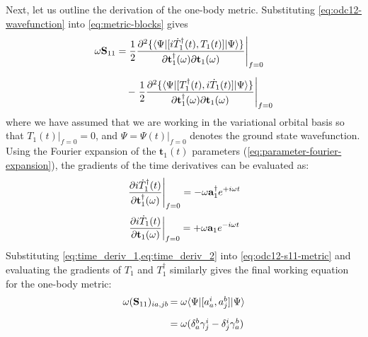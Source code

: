 Next, let us outline the derivation of the one-body metric.
Substituting \cref{eq:odc12-wavefunction} into \cref{eq:metric-blocks} gives
\begin{equation}
    \label{eq:odc12-s11-metric}
    \begin{array}{r@{\,}l}
        \omega
        \mathbf{S}_{11}
        =
        &
        \left.
            \dfrac{1}{2}
            \dfrac{%
                \partial^2
                \{\langle\Psi|
                    [i\dot{T}_1^\dagger(t), T_1(t)]
                |\Psi\rangle\}
            }{%
                \partial \mathbf{t}_1^\dagger(\omega)
                \partial \mathbf{t}_1(\omega)
            }
        \right|_{f=0}
        \\[20pt]
        &
        -
        \left.
            \dfrac{1}{2}
            \dfrac{%
                \partial^2
                \{\langle\Psi|[T_1^\dagger(t), i\dot{T}_1(t)]|\Psi\rangle\}
            }{%
                \partial \mathbf{t}_1^\dagger(\omega)
                \partial \mathbf{t}_1(\omega)
            }
        \right|_{f=0}
    \end{array}
\end{equation}
where we have assumed that we are working in the variational orbital basis so that
\(
    T_1(t)|_{f=0}
    =
    0
\),
and
\(
    \Psi
    =
    \Psi(t)|_{f=0}
\)
denotes the ground state wavefunction.
Using the Fourier expansion of the $\mathbf{t}_1(t)$ parameters
(\cref{eq:parameter-fourier-expansion}), the gradients of the time derivatives
can be evaluated as:
\begin{equation}
    \label{eq:time_deriv_1}
    \left.
    \frac{%
        \partial i \dot{T}_1^\dagger(t)
    }{%
        \partial \mathbf{t}_1^\dagger(\omega)
    }
    \right|_{f=0}
    =
    -
    \omega
    \mathbf{a}_1^\dagger
    e^{+i\omega t}
\end{equation}
\begin{equation}
    \label{eq:time_deriv_2}
    \left.
    \frac{%
        \partial i \dot{T}_1(t)
    }{%
        \partial \mathbf{t}_1(\omega)
    }
    \right|_{f=0}
    =
    +
    \omega
    \mathbf{a}_1
    e^{-i\omega t}
\end{equation}
Substituting \cref{eq:time_deriv_1,eq:time_deriv_2} into \cref{eq:odc12-s11-metric} and evaluating the gradients
of \(T_1\) and \(T_1^\dagger\) similarly gives the final working equation for
the one-body metric:
\begin{equation}
    \begin{array}{r@{\,}l}
        \omega
        (\mathbf{S}_{11})_{ia,jb}
        &=
        \omega
        \langle\Psi|
        [a_a^i, a_j^b]
        |\Psi\rangle
        \\[10pt]
        &=
        \omega
        (
            \delta^b_a
            \gamma^i_j
            -
            \delta^i_j
            \gamma^b_a
        )
    \end{array}
\end{equation}


